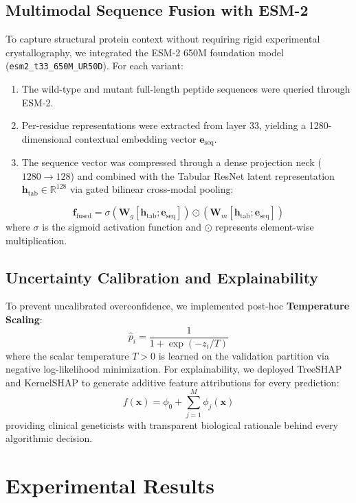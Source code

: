 \documentclass[conference]{IEEEtran}
\begin{document}
\subsection{Multimodal Sequence Fusion with ESM-2}
To capture structural protein context without requiring rigid experimental crystallography, we integrated the ESM-2 650M foundation model (\texttt{esm2\_t33\_650M\_UR50D}). For each variant:
\begin{enumerate}
    \item The wild-type and mutant full-length peptide sequences were queried through ESM-2.
    \item Per-residue representations were extracted from layer 33, yielding a 1280-dimensional contextual embedding vector $\mathbf{e}_{\text{seq}}$.
    \item The sequence vector was compressed through a dense projection neck ($1280 \rightarrow 128$) and combined with the Tabular ResNet latent representation $\mathbf{h}_{\text{tab}} \in \mathbb{R}^{128}$ via gated bilinear cross-modal pooling:
\end{enumerate}
\begin{equation}
    \mathbf{f}_{\text{fused}} = \sigma(\mathbf{W}_g [\mathbf{h}_{\text{tab}}; \mathbf{e}_{\text{seq}}]) \odot (\mathbf{W}_m [\mathbf{h}_{\text{tab}}; \mathbf{e}_{\text{seq}}])
\end{equation}
where $\sigma$ is the sigmoid activation function and $\odot$ represents element-wise multiplication.

\subsection{Uncertainty Calibration and Explainability}
To prevent uncalibrated overconfidence, we implemented post-hoc \textbf{Temperature Scaling}:
\begin{equation}
    \hat{p}_i = \frac{1}{1 + \exp(-z_i / T)}
\end{equation}
where the scalar temperature $T > 0$ is learned on the validation partition via negative log-likelihood minimization. For explainability, we deployed TreeSHAP and KernelSHAP to generate additive feature attributions for every prediction:
\begin{equation}
    f(\mathbf{x}) = \phi_0 + \sum_{j=1}^{M} \phi_j(\mathbf{x})
\end{equation}
providing clinical geneticists with transparent biological rationale behind every algorithmic decision.

\section{Experimental Results}
\end{document}
